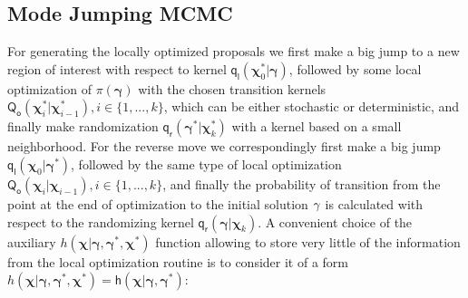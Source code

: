\documentclass[a0,portrait]{a0poster}
\begin{document}
\begin{multicols}{2}

\section*{Mode Jumping MCMC}
For generating the locally optimized proposals we first make a big jump to a new region of interest with respect to kernel $\mathsf{q}_\mathsf{l}(\boldsymbol{\chi}^{*}_0|\boldsymbol{\gamma})$, followed by some local optimization of $\pi{(\boldsymbol{\gamma})}$ with the chosen transition kernels $\mathsf{Q}_\mathsf{o}(\boldsymbol{\chi}^*_{i}|\boldsymbol{\chi}^*_{i-1}), i \in \{1,...,k\}$, which can be either stochastic or deterministic, and finally make randomization $\mathsf{q}_\mathsf{r}(\boldsymbol{\gamma}^*|\boldsymbol{\chi}^*_{k})$ with a kernel based on a small neighborhood. For the reverse move we correspondingly first make a big jump $\mathsf{q}_\mathsf{l}(\boldsymbol{\chi}_0|\boldsymbol{\gamma}^*)$, followed by the same type of local optimization $\mathsf{Q}_\mathsf{o}(\boldsymbol{\chi}_{i}|\boldsymbol{\chi}_{i-1}), i \in \{1,...,k\}$, and finally the probability of transition from the point at the end of optimization to the initial solution $\bold{\gamma}$ is calculated with respect to the randomizing kernel $\mathsf{q}_\mathsf{r}(\boldsymbol{\gamma}|\boldsymbol{\chi}_{k})$. A convenient choice of the auxiliary $h(\boldsymbol{\chi}|\boldsymbol{\gamma},\boldsymbol{\gamma}^*,\boldsymbol{\chi}^*)$ function \cite{geirs2011mhf} allowing to store very little of the information from the local optimization routine is to consider it of  a form $h(\boldsymbol{\chi}|\boldsymbol{\gamma},\boldsymbol{\gamma}^*,\boldsymbol{\chi}^*) = \mathsf{h}(\boldsymbol{\chi}|\boldsymbol{\gamma},\boldsymbol{\gamma}^*)$:


\end{multicols}
\end{document}
